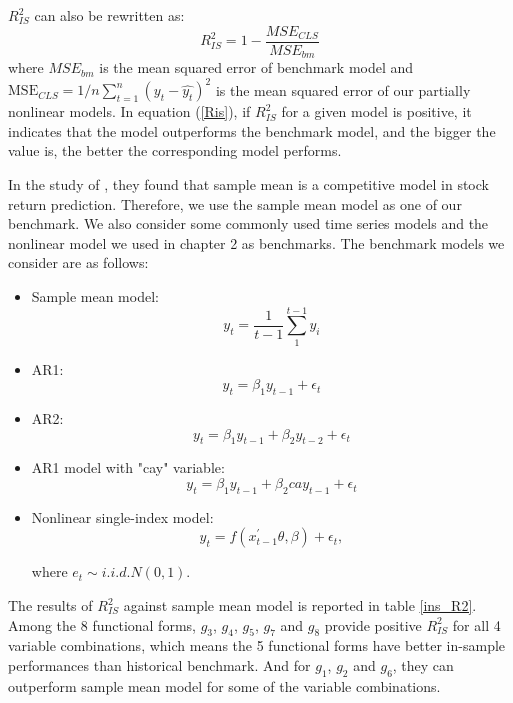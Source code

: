 \documentclass[a4paper,12pt,times,numbered,print,index]{report}
\numberwithin{equation}{section}
\begin{document}
$R^2_{IS}$ can also be rewritten as:
\begin{equation}
	R_{IS}^{2}=1-\frac{MSE_{CLS}}{MSE_{bm}}
	\label{Ris}
\end{equation}
where $MSE_{bm}$ is the mean squared error of benchmark model and $\mathrm{MSE}_{CLS}=1 / n \sum_{t=1}^{n}\left(y_{t}-\hat{y_t}\right)^{2}$ is the mean squared error of our partially nonlinear models.
In equation (\ref{Ris}), if $R^2_{IS}$ for a given model is positive, it indicates that the model outperforms the benchmark model, and the bigger the value is, the better the corresponding model performs.

In the study of \cite{welch2008comprehensive}, they found that sample mean is a competitive model in stock return prediction. Therefore, we use the sample mean model as one of our benchmark. We also consider some commonly used time series models and the nonlinear model we used in chapter 2 as benchmarks. The benchmark models we consider are as follows:

\begin{itemize}
	\item Sample mean model: 
	$$
	y_t= \dfrac{1}{t-1}\sum_{1}^{t-1}y_i
	$$
	\item AR1:
	$$
	y_t = \beta_{1}y_{t-1} + \epsilon_t
	$$
	\item AR2:
	$$
	y_t =\beta_{1} y_{t-1} + \beta_{2} y_{t-2} + \epsilon_t
	$$
	\item AR1 model with "cay" variable:
	$$
	y_t = \beta_{1}y_{t-1} + \beta_{2}cay_{t-1} + \epsilon_t
	$$
	\item Nonlinear single-index model:
	$$
	y_{t} = f\left( x_{t-1}^{\prime }\theta,\beta\right) + \epsilon_{t},
	$$
	
	where $e_{t}\sim i.i.d.N\left( 0,1\right).$
\end{itemize}

The results of $R^2_{IS}$ against sample mean model is reported in table \ref{ins_R2}. Among the 8 functional forms, $g_3$, $g_4$, $g_5$, $g_7$ and $g_8$ provide positive $R^2_{IS}$ for all 4 variable combinations, which means the 5 functional forms have better in-sample performances than historical benchmark. And for $g_1$, $g_2$ and $g_6$, they can outperform sample mean model for some of the variable combinations. 


\end{document}
